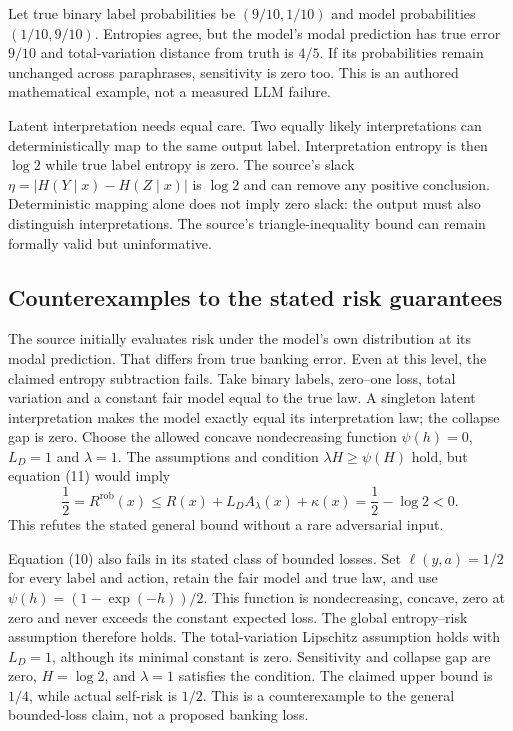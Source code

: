 Let true binary label probabilities be $(9/10,1/10)$ and model probabilities
$(1/10,9/10)$. Entropies agree, but the model's modal prediction has true
error $9/10$ and total-variation distance from truth is $4/5$. If its
probabilities remain unchanged across paraphrases, sensitivity is zero too.
This is an authored mathematical example, not a measured LLM failure.
\citep{exec23_sua_counterexamples}

Latent interpretation needs equal care. Two equally likely interpretations
can deterministically map to the same output label. Interpretation entropy
is then $\log2$ while true label entropy is zero. The source's slack
$\eta=|H(Y\mid x)-H(Z\mid x)|$ is $\log2$ and can remove any positive
conclusion. Deterministic mapping alone does not imply zero slack: the output
must also distinguish interpretations. The source's triangle-inequality bound
can remain formally valid but uninformative.
\citep{exec23_sua_original,exec23_sua_counterexamples}

\subsection{Counterexamples to the stated risk guarantees}
\label{eq:exec23-sua-counterexample}
The source initially evaluates risk under the model's own distribution at its
modal prediction. That differs from true banking error. Even at this level,
the claimed entropy subtraction fails. Take binary labels, zero--one loss,
total variation and a constant fair model equal to the true law. A singleton
latent interpretation makes the model exactly equal its interpretation law;
the collapse gap is zero. Choose the allowed concave nondecreasing function
$\psi(h)=0$, $L_D=1$ and $\lambda=1$. The assumptions and condition
$\lambda H\geq\psi(H)$ hold, but equation (11) would imply
\[
 \frac12=R^{\mathrm{rob}}(x)
 \leq R(x)+L_D A_\lambda(x)+\kappa(x)
 =\frac12-\log2<0.
\]
This refutes the stated general bound without a rare adversarial input.
\citep{exec23_sua_original,exec23_sua_counterexamples}

Equation (10) also fails in its stated class of bounded losses. Set
$\ell(y,a)=1/2$ for every label and action, retain the fair model and true
law, and use $\psi(h)=(1-\exp(-h))/2$. This function is nondecreasing,
concave, zero at zero and never exceeds the constant expected loss. The
global entropy--risk assumption therefore holds. The total-variation
Lipschitz assumption holds with $L_D=1$, although its minimal constant is
zero. Sensitivity and collapse gap are zero, $H=\log2$, and $\lambda=1$
satisfies the condition. The claimed upper bound is $1/4$, while actual
self-risk is $1/2$. This is a counterexample to the general bounded-loss
claim, not a proposed banking loss. \citep{exec23_sua_counterexamples}

